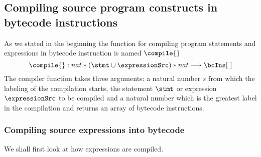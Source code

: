 

\subsection{Compiling source program  constructs in bytecode instructions} 

As we stated in the beginning the function for compiling program statements and expressions in bytecode instruction is named $\compile{}$
$$ \compile{ } : nat * (\stmt \cup \expressionSrc )* nat \longrightarrow  \bcIns [ \ ]  $$
The compiler function takes three arguments: a natural number $s$ from which the labeling of the compilation starts,
 the statement $\stmt$ or expression $\expressionSrc$  to be compiled and a natural number which is
 the greatest label in the compilation 
and returns an array of bytecode instructions.

\subsubsection{Compiling source expressions into bytecode}\label{pogEq:compile:compExpr}
We shall first look at how expressions are compiled.
 

